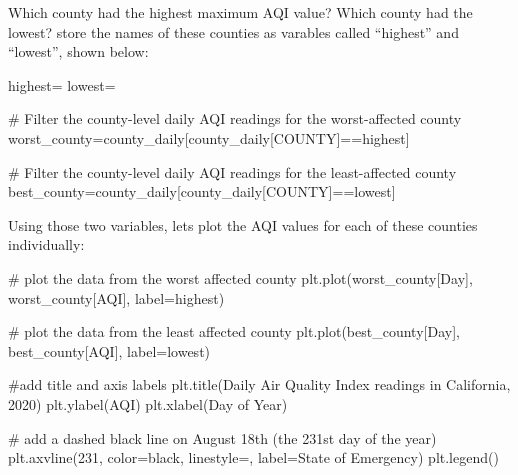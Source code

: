 \documentclass[
  letterpaper,
  DIV=11,
  numbers=noendperiod]{scrreprt}
\newenvironment{Shaded}{\begin{snugshade}}{\end{snugshade}}
\newcommand{\CommentTok}[1]{\textcolor[rgb]{0.37,0.37,0.37}{#1}}
\newcommand{\DecValTok}[1]{\textcolor[rgb]{0.68,0.00,0.00}{#1}}
\newcommand{\NormalTok}[1]{\textcolor[rgb]{0.00,0.23,0.31}{#1}}
\newcommand{\OperatorTok}[1]{\textcolor[rgb]{0.37,0.37,0.37}{#1}}
\newcommand{\StringTok}[1]{\textcolor[rgb]{0.13,0.47,0.30}{#1}}
\begin{document}
Which county had the highest maximum AQI value? Which county had the
lowest? store the names of these counties as varables called ``highest''
and ``lowest'', shown below:

\begin{Shaded}
\begin{Highlighting}[]
\NormalTok{highest}\OperatorTok{=}\StringTok{\textquotesingle{}\textquotesingle{}}
\NormalTok{lowest}\OperatorTok{=}\StringTok{\textquotesingle{}\textquotesingle{}}

\CommentTok{\# Filter the county{-}level daily AQI readings for the worst{-}affected county}
\NormalTok{worst\_county}\OperatorTok{=}\NormalTok{county\_daily[county\_daily[}\StringTok{\textquotesingle{}COUNTY\textquotesingle{}}\NormalTok{]}\OperatorTok{==}\NormalTok{highest]}

\CommentTok{\# Filter the county{-}level daily AQI readings for the least{-}affected county}
\NormalTok{best\_county}\OperatorTok{=}\NormalTok{county\_daily[county\_daily[}\StringTok{\textquotesingle{}COUNTY\textquotesingle{}}\NormalTok{]}\OperatorTok{==}\NormalTok{lowest]}
\end{Highlighting}
\end{Shaded}

Using those two variables, lets plot the AQI values for each of these
counties individually:

\begin{Shaded}
\begin{Highlighting}[]
\CommentTok{\# plot the data from the worst affected county}
\NormalTok{plt.plot(worst\_county[}\StringTok{\textquotesingle{}Day\textquotesingle{}}\NormalTok{], worst\_county[}\StringTok{\textquotesingle{}AQI\textquotesingle{}}\NormalTok{], label}\OperatorTok{=}\NormalTok{highest)}

\CommentTok{\# plot the data from the least affected county}
\NormalTok{plt.plot(best\_county[}\StringTok{\textquotesingle{}Day\textquotesingle{}}\NormalTok{], best\_county[}\StringTok{\textquotesingle{}AQI\textquotesingle{}}\NormalTok{], label}\OperatorTok{=}\NormalTok{lowest)}

\CommentTok{\#add title and axis labels}
\NormalTok{plt.title(}\StringTok{\textquotesingle{}Daily Air Quality Index readings in California, 2020\textquotesingle{}}\NormalTok{)}
\NormalTok{plt.ylabel(}\StringTok{\textquotesingle{}AQI\textquotesingle{}}\NormalTok{)}
\NormalTok{plt.xlabel(}\StringTok{\textquotesingle{}Day of Year\textquotesingle{}}\NormalTok{)}

\CommentTok{\# add a dashed black line on August 18th (the 231st day of the year)}
\NormalTok{plt.axvline(}\DecValTok{231}\NormalTok{, color}\OperatorTok{=}\StringTok{\textquotesingle{}black\textquotesingle{}}\NormalTok{, linestyle}\OperatorTok{=}\StringTok{\textquotesingle{}{-}{-}\textquotesingle{}}\NormalTok{, label}\OperatorTok{=}\StringTok{\textquotesingle{}State of Emergency\textquotesingle{}}\NormalTok{)}
\NormalTok{plt.legend()}
\end{Highlighting}
\end{Shaded}
\end{document}
